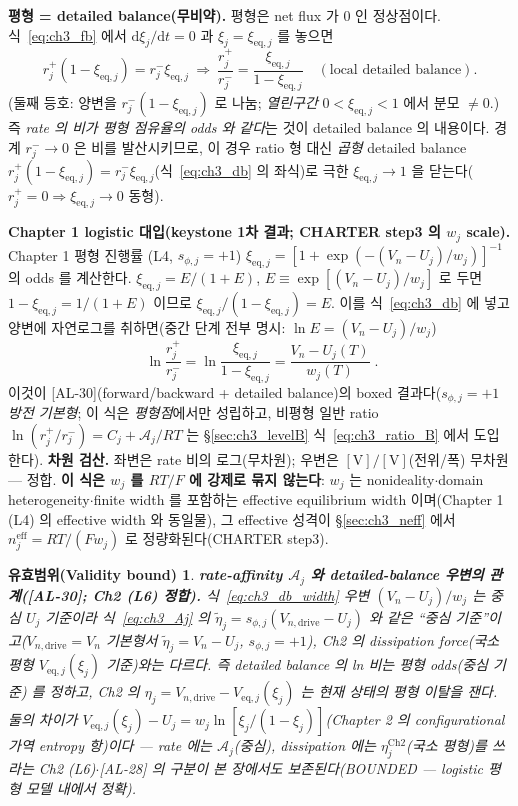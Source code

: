 \documentclass[11pt,a4paper]{article}
\newtheorem*{boundbox}{유효범위(Validity bound)}
\newcommand{\dd}{\mathrm{d}}
\newcommand{\eff}{\mathrm{eff}}
\newcommand{\eq}{\mathrm{eq}}
\newcommand{\drive}{\mathrm{drive}}
\newcommand{\AL}[1]{\textsf{[AL-#1]}}
\begin{document}
\textbf{평형 = detailed balance(무비약).} 평형은 net flux 가 $0$ 인 정상점이다. 식~\eqref{eq:ch3_fb} 에서
$\dd\xi_j/\dd t=0$ 과 $\xi_j=\xi_{\eq,j}$ 를 놓으면
\begin{equation}
r_j^+(1-\xi_{\eq,j})=r_j^-\xi_{\eq,j}
\ \Longrightarrow\
\frac{r_j^+}{r_j^-}=\frac{\xi_{\eq,j}}{1-\xi_{\eq,j}}\quad(\text{local detailed balance}).
\label{eq:ch3_db}
\end{equation}
(둘째 등호: 양변을 $r_j^-(1-\xi_{\eq,j})$ 로 나눔; \emph{열린구간} $0<\xi_{\eq,j}<1$ 에서 분모 $\ne0$.) 즉 \emph{rate 의 비가
평형 점유율의 odds 와 같다}는 것이 detailed balance 의 내용이다. 경계 $r_j^-\to0$ 은 비를 발산시키므로, 이 경우
ratio 형 대신 \emph{곱형} detailed balance $r_j^+(1-\xi_{\eq,j})=r_j^-\xi_{\eq,j}$(식~\eqref{eq:ch3_db} 의 좌식)로
극한 $\xi_{\eq,j}\to1$ 을 닫는다($r_j^+=0\Rightarrow\xi_{\eq,j}\to0$ 동형).

\textbf{Chapter 1 logistic 대입(keystone 1차 결과; CHARTER step3 의 $w_j$ scale).} Chapter 1 평형 진행률
(L4, $s_{\phi,j}=+1$) $\xi_{\eq,j}=[1+\exp(-(V_n-U_j)/w_j)]^{-1}$ 의 odds 를 계산한다. $\xi_{\eq,j}=E/(1+E)$,
$E\equiv\exp[(V_n-U_j)/w_j]$ 로 두면 $1-\xi_{\eq,j}=1/(1+E)$ 이므로 $\xi_{\eq,j}/(1-\xi_{\eq,j})=E$. 이를
식~\eqref{eq:ch3_db} 에 넣고 양변에 자연로그를 취하면(중간 단계 전부 명시: $\ln E=(V_n-U_j)/w_j$)
\begin{equation}
\boxed{\;\ln\frac{r_j^+}{r_j^-}=\ln\frac{\xi_{\eq,j}}{1-\xi_{\eq,j}}=\frac{V_n-U_j(T)}{w_j(T)}\;.}
\label{eq:ch3_db_width}
\end{equation}
이것이 \AL{30}(forward/backward + detailed balance)의 boxed 결과다(\emph{$s_{\phi,j}=+1$ 방전 기본형}; 이 식은
\emph{평형점}에서만 성립하고, 비평형 일반 ratio $\ln(r_j^+/r_j^-)=C_j+\mathcal A_j/RT$ 는 \S\ref{sec:ch3_levelB}
식~\eqref{eq:ch3_ratio_B} 에서 도입한다). \textbf{차원 검산.} 좌변은 rate 비의
로그(무차원); 우변은 $[\mathrm V]/[\mathrm V]$(전위/폭) 무차원 — 정합. \textbf{이 식은 $w_j$ 를 $RT/F$ 에 강제로
묶지 않는다}: $w_j$ 는 nonideality$\cdot$domain heterogeneity$\cdot$finite width 를 포함하는 effective
equilibrium width 이며(Chapter 1 (L4) 의 effective width 와 동일물), 그 effective 성격이 \S\ref{sec:ch3_neff}
에서 $n_j^{\eff}=RT/(Fw_j)$ 로 정량화된다(CHARTER step3).
\begin{boundbox}
\textbf{rate-affinity $\mathcal A_j$ 와 detailed-balance 우변의 관계(\AL{30}; Ch2 (L6) 정합).} 식~\eqref{eq:ch3_db_width}
우변 $(V_n-U_j)/w_j$ 는 \emph{중심} $U_j$ 기준이라 식~\eqref{eq:ch3_Aj} 의 $\tilde\eta_j=s_{\phi,j}(V_{n,\drive}-U_j)$
와 같은 ``중심 기준''이고($V_{n,\drive}=V_n$ 기본형서 $\tilde\eta_j=V_n-U_j$, $s_{\phi,j}=+1$), Ch2 의 dissipation
force(국소 평형 $V_{\eq,j}(\xi_j)$ 기준)와는 다르다. 즉 detailed balance 의 ln 비는 \emph{평형 odds}(중심 기준)
를 정하고, Ch2 의 $\eta_j=V_{n,\drive}-V_{\eq,j}(\xi_j)$ 는 \emph{현재 상태의} 평형 이탈을 잰다. 둘의 차이가
$V_{\eq,j}(\xi_j)-U_j=w_j\ln[\xi_j/(1-\xi_j)]$(Chapter 2 의 configurational 가역 entropy 항)이다 — rate 에는
$\mathcal A_j$(중심), dissipation 에는 $\eta_j^{\mathrm{Ch2}}$(국소 평형)를 쓰라는 Ch2 (L6)$\cdot$\AL{28} 의
구분이 본 장에서도 보존된다(BOUNDED — logistic 평형 모델 내에서 정확).
\end{boundbox}
\end{document}
